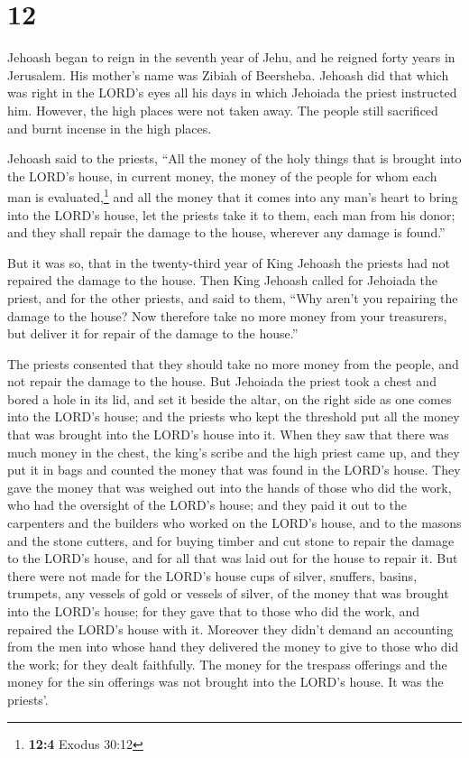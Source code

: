 \hypertarget{section-11}{%
\section{12}\label{section-11}}

 Jehoash began to reign in the seventh year of Jehu, and
he reigned forty years in Jerusalem. His mother's name was Zibiah of
Beersheba.  Jehoash did that which was right in the LORD's
eyes all his days in which Jehoiada the priest instructed him.
 However, the high places were not taken away. The people
still sacrificed and burnt incense in the high places.

 Jehoash said to the priests, ``All the money of the holy
things that is brought into the LORD's house, in current money, the
money of the people for whom each man is evaluated,\footnote{\textbf{12:4}
  Exodus 30:12} and all the money that it comes into any man's heart to
bring into the LORD's house,  let the priests take it to
them, each man from his donor; and they shall repair the damage to the
house, wherever any damage is found.''

 But it was so, that in the twenty-third year of King
Jehoash the priests had not repaired the damage to the house.
 Then King Jehoash called for Jehoiada the priest, and for
the other priests, and said to them, ``Why aren't you repairing the
damage to the house? Now therefore take no more money from your
treasurers, but deliver it for repair of the damage to the house.''

 The priests consented that they should take no more money
from the people, and not repair the damage to the house. 
But Jehoiada the priest took a chest and bored a hole in its lid, and
set it beside the altar, on the right side as one comes into the LORD's
house; and the priests who kept the threshold put all the money that was
brought into the LORD's house into it.  When they saw
that there was much money in the chest, the king's scribe and the high
priest came up, and they put it in bags and counted the money that was
found in the LORD's house.  They gave the money that was
weighed out into the hands of those who did the work, who had the
oversight of the LORD's house; and they paid it out to the carpenters
and the builders who worked on the LORD's house,  and to
the masons and the stone cutters, and for buying timber and cut stone to
repair the damage to the LORD's house, and for all that was laid out for
the house to repair it.  But there were not made for the
LORD's house cups of silver, snuffers, basins, trumpets, any vessels of
gold or vessels of silver, of the money that was brought into the LORD's
house;  for they gave that to those who did the work, and
repaired the LORD's house with it.  Moreover they didn't
demand an accounting from the men into whose hand they delivered the
money to give to those who did the work; for they dealt faithfully.
 The money for the trespass offerings and the money for
the sin offerings was not brought into the LORD's house. It was the
priests'.

